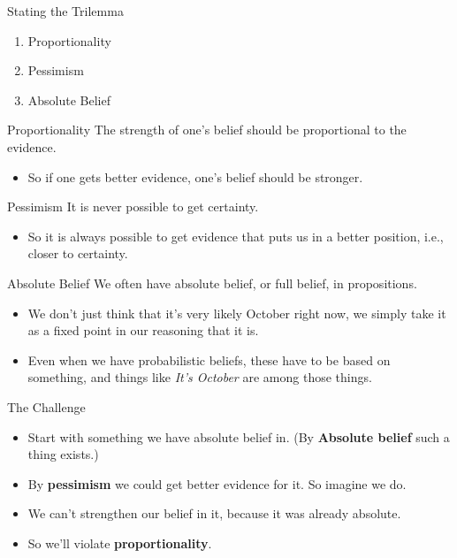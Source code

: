 \documentclass[
  17pt,
  letterpaper,
  ignorenonframetext,
  aspectratio=169,
]{beamer}
\providecommand{\tightlist}{%
  \setlength{\itemsep}{0pt}\setlength{\parskip}{0pt}}\usepackage{longtable,booktabs,array}
\begin{document}
\begin{frame}{Stating the Trilemma}
\protect\hypertarget{stating-the-trilemma}{}
\begin{enumerate}[<+->]
\tightlist
\item
  Proportionality
\item
  Pessimism
\item
  Absolute Belief
\end{enumerate}
\end{frame}

\begin{frame}{Proportionality}
\protect\hypertarget{proportionality}{}
The strength of one's belief should be proportional to the evidence.

\begin{itemize}[<+->]
\tightlist
\item
  So if one gets better evidence, one's belief should be stronger.
\end{itemize}
\end{frame}

\begin{frame}{Pessimism}
\protect\hypertarget{pessimism}{}
It is never possible to get certainty.

\begin{itemize}[<+->]
\tightlist
\item
  So it is always possible to get evidence that puts us in a better
  position, i.e., closer to certainty.
\end{itemize}
\end{frame}

\begin{frame}{Absolute Belief}
\protect\hypertarget{absolute-belief}{}
We often have absolute belief, or full belief, in propositions.

\begin{itemize}[<+->]
\tightlist
\item
  We don't just think that it's very likely October right now, we simply
  take it as a fixed point in our reasoning that it is.
\item
  Even when we have probabilistic beliefs, these have to be based on
  something, and things like \emph{It's October} are among those things.
\end{itemize}
\end{frame}

\begin{frame}{The Challenge}
\protect\hypertarget{the-challenge}{}
\begin{itemize}[<+->]
\tightlist
\item
  Start with something we have absolute belief in. (By \textbf{Absolute
  belief} such a thing exists.)
\item
  By \textbf{pessimism} we could get better evidence for it. So imagine
  we do.
\item
  We can't strengthen our belief in it, because it was already absolute.
\item
  So we'll violate \textbf{proportionality}.
\end{itemize}
\end{frame}
\end{document}
